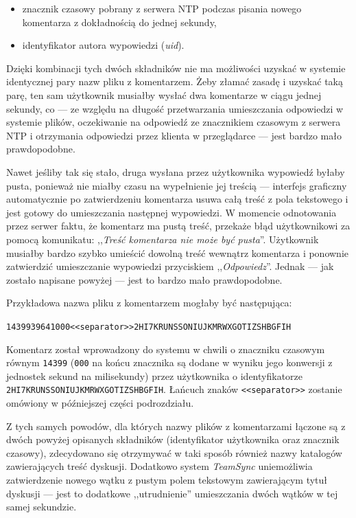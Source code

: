 \documentclass[polish,a4paper,twoside]{ppfcmthesis}
\begin{document}
\begin{itemize}[noitemsep]
  \item znacznik czasowy pobrany z serwera NTP podczas pisania nowego komentarza z dokładnością do jednej sekundy,
  
  \item identyfikator autora wypowiedzi (\emph{uid}).
\end{itemize}

Dzięki kombinacji tych dwóch składników nie ma możliwości uzyskać w systemie identycznej pary nazw pliku z komentarzem. Żeby złamać zasadę i uzyskać taką parę, ten sam użytkownik musiałby wysłać dwa komentarze w ciągu jednej sekundy, co --- ze względu na długość przetwarzania umieszczania odpowiedzi w systemie plików, oczekiwanie na odpowiedź ze znacznikiem czasowym z serwera NTP i otrzymania odpowiedzi przez klienta w przeglądarce --- jest bardzo mało prawdopodobne.

Nawet jeśliby tak się stało, druga wysłana przez użytkownika wypowiedź byłaby pusta, ponieważ nie miałby czasu na wypełnienie jej treścią --- interfejs graficzny automatycznie po zatwierdzeniu komentarza usuwa całą treść z pola tekstowego i jest gotowy do umieszczania następnej wypowiedzi. W momencie odnotowania przez serwer faktu, że komentarz ma pustą treść, przekaże błąd użytkownikowi za pomocą komunikatu: ,,\emph{Treść komentarza nie może być pusta}''. Użytkownik musiałby bardzo szybko umieścić dowolną treść wewnątrz komentarza i ponownie zatwierdzić umieszczanie wypowiedzi przyciskiem ,,\emph{Odpowiedz}''. Jednak --- jak zostało napisane powyżej --- jest to bardzo mało prawdopodobne.

Przykładowa nazwa pliku z komentarzem mogłaby być następująca:

\begin{center}
  \texttt{1439939641000<<separator>>2HI7KRUNSSONIUJKMRWXGOTIZSHBGFIH}
\end{center}

Komentarz został wprowadzony do systemu w chwili o znaczniku czasowym równym \texttt{14399} (\texttt{000} na końcu znacznika są dodane w wyniku jego konwersji z jednostek sekund na milisekundy) przez użytkownika o identyfikatorze \texttt{2HI7KRUN\-SSONIUJK\-MRWXGOTI\-ZSHBGFIH}. Łańcuch znaków \texttt{<<separator>>} zostanie omówiony w późniejszej części podrozdziału.

Z tych samych powodów, dla których nazwy plików z komentarzami łączone są z dwóch powyżej opisanych składników (identyfikator użytkownika oraz znacznik czasowy), zdecydowano się otrzymywać w taki sposób również nazwy katalogów zawierających treść dyskusji. Dodatkowo system \emph{TeamSync} uniemożliwia zatwierdzenie nowego wątku z pustym polem tekstowym zawierającym tytuł dyskusji --- jest to dodatkowe ,,utrudnienie'' umieszczania dwóch wątków w tej samej sekundzie.
\end{document}
